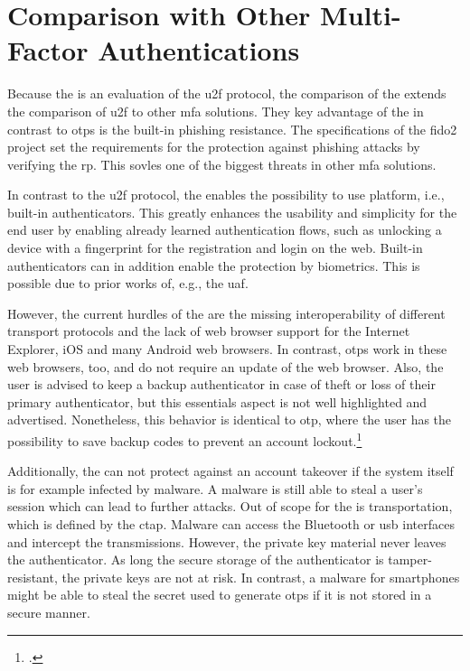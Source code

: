 \section{Comparison with Other Multi-Factor Authentications}
\label{chapter:comparison}

Because the \wa{} is an evaluation of the \gls{u2f} protocol, the comparison of the \wa{} extends the comparison of \gls{u2f} to other \gls{mfa} solutions. They key advantage of the \wa{} in contrast to \glspl{otp} is the built-in phishing resistance. The specifications of the \gls{fido}2 project set the requirements for the protection against phishing attacks by verifying the \gls{rp}. This sovles one of the biggest threats in other \gls{mfa} solutions.

In contrast to the \gls{u2f} protocol, the \wa{} enables the possibility to use platform, i.e., built-in authenticators. This greatly enhances the usability and simplicity for the end user by enabling already learned authentication flows, such as unlocking a device with a fingerprint for the registration and login on the web. Built-in authenticators can in addition enable the protection by biometrics. This is possible due to prior works of, e.g., the \gls{uaf}.

 However, the current hurdles of the \wa{} are the missing interoperability of different transport protocols and the lack of web browser support for the Internet Explorer, iOS and many Android web browsers. In contrast, \glspl{otp} work in these web browsers, too, and do not require an update of the web browser. Also, the user is advised to keep a backup authenticator in case of theft or loss of their primary authenticator, but this essentials aspect is not well highlighted and advertised. Nonetheless, this behavior is identical to \gls{otp}, where the user has the possibility to save backup codes to prevent an account lockout.\footcites[See][36]{10.1007/978-3-319-45931-8_3}
 
 Additionally, the \wa{} can not protect against an account takeover if the system itself is for example infected by malware. A malware is still able to steal a user's session which can lead to further attacks. Out of scope for the \wa{} is transportation, which is defined by the \gls{ctap}. Malware can access the Bluetooth or \gls{usb} interfaces and intercept the transmissions. However, the private key material never leaves the authenticator. As long the secure storage of the authenticator is tamper-resistant, the private keys are not at risk. In contrast, a malware for smartphones might be able to steal the secret used to generate \glspl{otp} if it is not stored in a secure manner.
 
